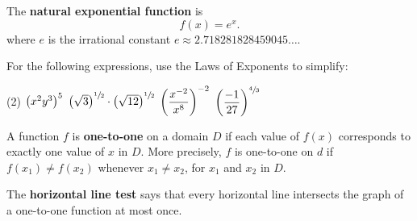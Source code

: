 \documentclass[answers]{exam}
\begin{document}
  \begin{defn*}
    The \textbf{natural exponential function} is 
      \[f(x)=e^x.\]
    where $e$ is the irrational constant $e\approx2.718281828459045\dots$.
  \end{defn*}
  \pagebreak
  
  \noindent
  \begin{ex*}
    For the following expressions, use the Laws of Exponents to simplify:
  \end{ex*}
  \begin{tasks}[after-item-skip=\stretch{1}](2)
    \task $\parens{x^2y^3}^5$
    \task $\parens{\sqrt 3}^{\sfrac{1}{2}}\cdot\parens{\sqrt{12}}^{\sfrac{1}{2}}$
    \task $\parens{\dfrac{x\inv[2]}{x^8}}\inv[2]$
    \task $\parens{\dfrac{-1}{27}}^{\sfrac{4}{3}}$
  \end{tasks}
  \pagebreak
  
  \begin{defn*}
  
    A function $f$ is \textbf{one-to-one} on a domain $D$ if each value of $f(x)$ corresponds to exactly one value of $x$ in $D$. More precisely, $f$ is one-to-one on $d$ if $f(x_1)\neq f(x_2)$ whenever $x_1\neq x_2$, for $x_1$ and $x_2$ in $D$. 
    
    The \textbf{horizontal line test} says that every horizontal line intersects the graph of a one-to-one function at most once.
  \end{defn*}
  
\end{document}
